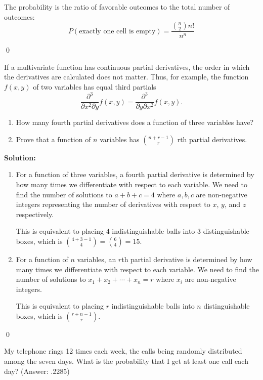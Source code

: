 The probability is the ratio of favorable outcomes to the total number of outcomes:
\[ P(\text{exactly one cell is empty}) = \frac{\binom{n}{2} n!}{n^n} \]


\qed
\begin{problembox}
If a multivariate function has continuous partial derivatives, the order in which the derivatives are calculated does not matter. Thus, for example, the function $f(x,y)$ of two variables has equal third partials
\[ \frac{\partial^{3}}{\partial x^{2}\partial y}f(x,y)=\frac{\partial^{3}}{\partial y\partial x^{2}}f(x,y). \]
\begin{enumerate}[label=(\alph*)]
    \item How many fourth partial derivatives does a function of three variables have?
    \item Prove that a function of $n$ variables has $\binom{n+r-1}{r}$ rth partial derivatives.
\end{enumerate}
\end{problembox}

\noindent\textbf{Solution:}
\begin{enumerate}[label=(\alph*)]
    \item For a function of three variables, a fourth partial derivative is determined by how many times we differentiate with respect to each variable. We need to find the number of solutions to $a + b + c = 4$ where $a, b, c$ are non-negative integers representing the number of derivatives with respect to $x$, $y$, and $z$ respectively.
    
    This is equivalent to placing 4 indistinguishable balls into 3 distinguishable boxes, which is $\binom{4+3-1}{4} = \binom{6}{4} = 15$.
    
    \item For a function of $n$ variables, an $r$th partial derivative is determined by how many times we differentiate with respect to each variable. We need to find the number of solutions to $x_1 + x_2 + \cdots + x_n = r$ where $x_i$ are non-negative integers.
    
    This is equivalent to placing $r$ indistinguishable balls into $n$ distinguishable boxes, which is $\binom{r+n-1}{r}$.
\end{enumerate}



\qed
\begin{problembox}
My telephone rings 12 times each week, the calls being randomly distributed among the seven days. What is the probability that I get at least one call each day?
(Answer: .2285)
\end{problembox}

